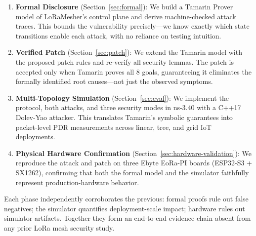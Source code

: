 \documentclass[10pt,journal,compsoc]{IEEEtran}
\begin{document}
\begin{enumerate}[label=\textbf{Phase \arabic*.}]
  \item \textbf{Formal Disclosure} (Section~\ref{sec:formal}):
    We build a Tamarin Prover model of LoRaMesher's control plane
    and derive machine-checked attack traces. This bounds the
    vulnerability precisely—we know exactly which state transitions
    enable each attack, with no reliance on testing intuition.

  \item \textbf{Verified Patch} (Section~\ref{sec:patch}):
    We extend the Tamarin model with the proposed patch rules and
    re-verify all security lemmas. The patch is accepted only when
    Tamarin proves all 8 goals, guaranteeing it eliminates the
    formally identified root causes—not just the observed symptoms.

  \item \textbf{Multi-Topology Simulation} (Section~\ref{sec:eval}):
    We implement the protocol, both attacks, and three security modes
    in ns-3.40 with a C++17 Dolev-Yao attacker. This translates
    Tamarin's symbolic guarantees into packet-level PDR measurements
    across linear, tree, and grid IoT deployments.

  \item \textbf{Physical Hardware Confirmation}
    (Section~\ref{sec:hardware-validation}):
    We reproduce the attack and patch on three Ebyte EoRa-PI boards
    (ESP32-S3 + SX1262), confirming that both the formal model and
    the simulator faithfully represent production-hardware behavior.
\end{enumerate}

Each phase independently corroborates the previous: formal proofs
rule out false negatives; the simulator quantifies deployment-scale
impact; hardware rules out simulator artifacts. Together they form
an end-to-end evidence chain absent from any prior LoRa mesh
security study.
\end{document}
